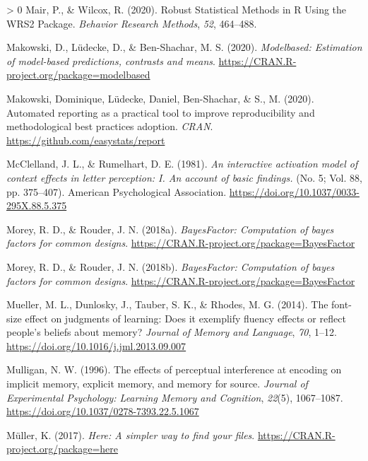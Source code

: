 \documentclass[
  english,
  jou]{apa7}
\newlength{\cslhangindent}
\newenvironment{CSLReferences}[3] %
 {%
  \setlength{\parindent}{0pt}
  \ifodd #1 \everypar{\setlength{\hangindent}{\cslhangindent}}\ignorespaces\fi
  \ifnum #2 > 0
  \setlength{\parskip}{#2\baselineskip}
  \fi
 }%
 {}
\begin{document}
\begin{CSLReferences}{1}{0}
\leavevmode\hypertarget{ref-R-WRS2}{}%
Mair, P., \& Wilcox, R. (2020). {Robust Statistical Methods in R Using the WRS2 Package}. \emph{Behavior Research Methods}, \emph{52}, 464--488.

\leavevmode\hypertarget{ref-R-modelbased}{}%
Makowski, D., Lüdecke, D., \& Ben-Shachar, M. S. (2020). \emph{Modelbased: Estimation of model-based predictions, contrasts and means}. \url{https://CRAN.R-project.org/package=modelbased}

\leavevmode\hypertarget{ref-R-report}{}%
Makowski, Dominique, Lüdecke, Daniel, Ben-Shachar, \& S., M. (2020). Automated reporting as a practical tool to improve reproducibility and methodological best practices adoption. \emph{CRAN}. \url{https://github.com/easystats/report}

\leavevmode\hypertarget{ref-McClelland1981}{}%
McClelland, J. L., \& Rumelhart, D. E. (1981). \emph{{An interactive activation model of context effects in letter perception: I. An account of basic findings.}} (No. 5; Vol. 88, pp. 375--407). American Psychological Association. \url{https://doi.org/10.1037/0033-295X.88.5.375}

\leavevmode\hypertarget{ref-Morey2018}{}%
Morey, R. D., \& Rouder, J. N. (2018a). \emph{BayesFactor: Computation of bayes factors for common designs}. \url{https://CRAN.R-project.org/package=BayesFactor}

\leavevmode\hypertarget{ref-R-BayesFactor}{}%
Morey, R. D., \& Rouder, J. N. (2018b). \emph{BayesFactor: Computation of bayes factors for common designs}. \url{https://CRAN.R-project.org/package=BayesFactor}

\leavevmode\hypertarget{ref-Mueller2014}{}%
Mueller, M. L., Dunlosky, J., Tauber, S. K., \& Rhodes, M. G. (2014). {The font-size effect on judgments of learning: Does it exemplify fluency effects or reflect people's beliefs about memory?} \emph{Journal of Memory and Language}, \emph{70}, 1--12. \url{https://doi.org/10.1016/j.jml.2013.09.007}

\leavevmode\hypertarget{ref-Mulligan1996}{}%
Mulligan, N. W. (1996). {The effects of perceptual interference at encoding on implicit memory, explicit memory, and memory for source}. \emph{Journal of Experimental Psychology: Learning Memory and Cognition}, \emph{22}(5), 1067--1087. \url{https://doi.org/10.1037/0278-7393.22.5.1067}

\leavevmode\hypertarget{ref-R-here}{}%
Müller, K. (2017). \emph{Here: A simpler way to find your files}. \url{https://CRAN.R-project.org/package=here}


\end{CSLReferences}
\end{document}
